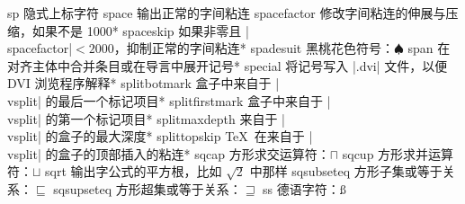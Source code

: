 \capcs sp {隐式上标字符}{}{}
\capcs space {输出正常的字间粘连}{}{}
\capcs spacefactor {修改字间粘连的伸展与压缩，如果不是 1000}*{}
\capcs spaceskip {如果非零且 |\\spacefactor|${}<2000$，抑制正常的字间粘连}*{}
\capcs spadesuit {黑桃花色符号：$\spadesuit$}{}{}
\capcs span {在对齐主体中合并条目或在导言中展开记号}*{}
\capcs special {将记号写入 |.dvi| 文件，以便 DVI 浏览程序解释}*{}
\capcs splitbotmark {盒子中来自于 |\\vsplit| 的最后一个标记项目}*{}
\capcs splitfirstmark {盒子中来自于 |\\vsplit| 的第一个标记项目}*{}
\capcs splitmaxdepth {来自于 |\\vsplit| 的盒子的最大深度}*{}
\capcs splittopskip {\TeX\ 在来自于 |\\vsplit| 的盒子的顶部插入的粘连}*{}
\capcs sqcap {方形求交运算符：$\sqcap$}{}{}
\capcs sqcup {方形求并运算符：$\sqcup$}{}{}
\capcs sqrt {输出字公式的平方根，比如 $\sqrt 2$ 中那样}{}{}
\capcs sqsubseteq {方形子集或等于关系：$\sqsubseteq$}{}{}
\capcs sqsupseteq {方形超集或等于关系：$\sqsupseteq$}{}{}
\capcs ss {德语字符：\ss}{}{}
